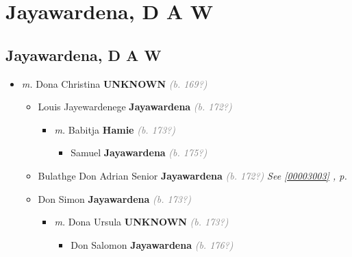 \documentclass[10pt, openany]{book}
\begin{document}
\part{Jayawardena, D A W}
\chapter{Jayawardena, D A W}
\label{00003001}
\textcolor{slmaroon}{\textit{}}
\begin{itemize}
\item{\textit{m.} Dona Christina \textbf{UNKNOWN} \textcolor{gray}{\textit{(b. 169?)}}   \label{couple:00003001:00003002} \begin{itemize}
\item{Louis Jayewardenege \textbf{Jayawardena} \textcolor{gray}{\textit{(b. 172?)}}
\begin{itemize}
\item{\textit{m.} Babitja \textbf{Hamie} \textcolor{gray}{\textit{(b. 173?)}}   \label{couple:00003582:00003583} \begin{itemize}
\item{Samuel \textbf{Jayawardena} \textcolor{gray}{\textit{(b. 175?)}}
 }
\end{itemize}}
\end{itemize}
  }
\item{Bulathge Don Adrian Senior \textbf{Jayawardena} \textcolor{gray}{\textit{(b. 172?)}} \textcolor{slteal}{\textit{See  \autoref{00003003} \textit{, p. \pageref{00003003} }}}}
\item{Don Simon \textbf{Jayawardena} \textcolor{gray}{\textit{(b. 173?)}}
\begin{itemize}
\item{\textit{m.} Dona Ursula \textbf{UNKNOWN} \textcolor{gray}{\textit{(b. 173?)}}   \label{couple:00003579:00003580} \begin{itemize}
\item{Don Salomon \textbf{Jayawardena} \textcolor{gray}{\textit{(b. 176?)}}
  }
\end{itemize}}
\end{itemize}
  }
\end{itemize}}
\end{itemize}
   
\end{document}
